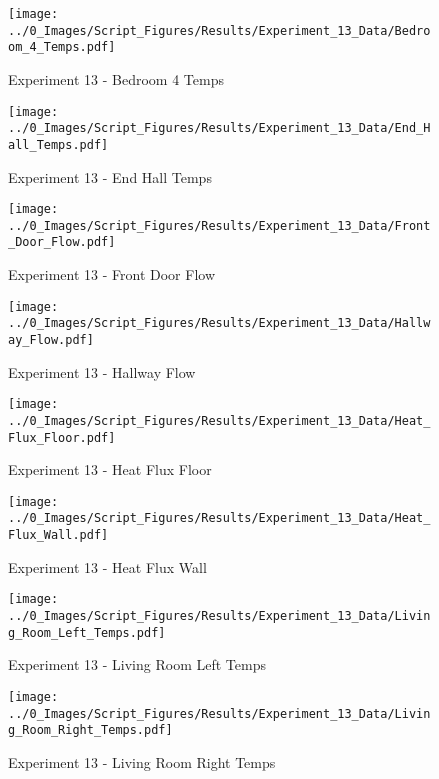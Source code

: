 	\clearpage

	\begin{figure}[H]
		\centering
		\texttt{[image: ../0\_Images/Script\_Figures/Results/Experiment\_13\_Data/Bedroom\_4\_Temps.pdf]}
		\caption[]{Experiment 13 - Bedroom 4 Temps}
	\end{figure}
 

	\begin{figure}[H]
		\centering
		\texttt{[image: ../0\_Images/Script\_Figures/Results/Experiment\_13\_Data/End\_Hall\_Temps.pdf]}
		\caption[]{Experiment 13 - End Hall Temps}
	\end{figure}
 
	\clearpage

	\begin{figure}[H]
		\centering
		\texttt{[image: ../0\_Images/Script\_Figures/Results/Experiment\_13\_Data/Front\_Door\_Flow.pdf]}
		\caption[]{Experiment 13 - Front Door Flow}
	\end{figure}
 

	\begin{figure}[H]
		\centering
		\texttt{[image: ../0\_Images/Script\_Figures/Results/Experiment\_13\_Data/Hallway\_Flow.pdf]}
		\caption[]{Experiment 13 - Hallway Flow}
	\end{figure}
 
	\clearpage

	\begin{figure}[H]
		\centering
		\texttt{[image: ../0\_Images/Script\_Figures/Results/Experiment\_13\_Data/Heat\_Flux\_Floor.pdf]}
		\caption[]{Experiment 13 - Heat Flux Floor}
	\end{figure}
 

	\begin{figure}[H]
		\centering
		\texttt{[image: ../0\_Images/Script\_Figures/Results/Experiment\_13\_Data/Heat\_Flux\_Wall.pdf]}
		\caption[]{Experiment 13 - Heat Flux Wall}
	\end{figure}
 
	\clearpage

	\begin{figure}[H]
		\centering
		\texttt{[image: ../0\_Images/Script\_Figures/Results/Experiment\_13\_Data/Living\_Room\_Left\_Temps.pdf]}
		\caption[]{Experiment 13 - Living Room Left Temps}
	\end{figure}
 

	\begin{figure}[H]
		\centering
		\texttt{[image: ../0\_Images/Script\_Figures/Results/Experiment\_13\_Data/Living\_Room\_Right\_Temps.pdf]}
		\caption[]{Experiment 13 - Living Room Right Temps}
	\end{figure}
 
